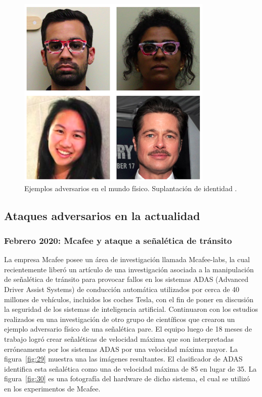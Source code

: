 \begin{figure}[th]
\centering
\includegraphics [scale = 1] {Figures/figura_28.PNG}
\decoRule
\caption[Suplantación de identidad]{Ejemplos adversarios en el mundo físico. Suplantación de identidad \parencite{r56}.}
\label{fig:28}
\end{figure}

\subsection{Ataques adversarios en la actualidad}
\subsubsection{Febrero 2020: Mcafee y ataque a señalética de tránsito}
La empresa Mcafee posee un área de investigación llamada Mcafee-labs, la cual recientemente liberó un artículo \parencite{r53} de una investigación asociada a la manipulación de señalética de tránsito para provocar fallos en los sistemas ADAS (Advanced Driver Assist Systems) de conducción automática utilizados por cerca de 40 millones de vehículos, incluidos los coches Tesla, con el fin de poner en discusión la seguridad de los sistemas de inteligencia artificial. Continuaron con los estudios realizados en una investigación de otro grupo de científicos \parencite{r52} que crearon un ejemplo adversario físico de una señalética pare. El equipo luego de 18 meses de trabajo logró crear señaléticas de velocidad máxima que son interpretadas erróneamente por los sistemas ADAS por una velocidad máxima mayor. 
La figura~\ref{fig:29} muestra una las imágenes resultantes. El clasificador de ADAS identifica esta señalética como una de velocidad máxima de 85 en lugar de 35. La figura~\ref{fig:30} es una fotografía del hardware de dicho sistema, el cual se utilizó en los experimentos de Mcafee. 

